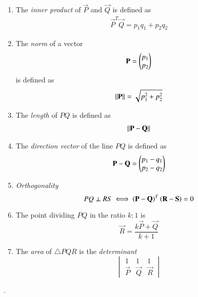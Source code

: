 \renewcommand{\theequation}{\theenumi}

\begin{enumerate}[label=\arabic*.,ref=\thesubsection.\theenumi]

\item The {\em inner product} of  $\vec{P}$ and $\vec{Q}$ is defined as
\begin{align}
\vec{P}^T\vec{Q} = p_1q_1+p_2q_2
\end{align}
\item The {\em norm} of a vector 
\begin{align}
\mathbf{P} = \begin{pmatrix}p_1\\p_2\end{pmatrix}
\end{align}
is defined as
\begin{align}
\lVert\mathbf{P}\rVert = \sqrt{p_1^2+p_2^2}
\end{align}
\item The {\em length} of $PQ$ is defined as
\begin{align}
\lVert\mathbf{P}-\mathbf{Q}\rVert
\end{align}


%
\item The {\em direction vector} of the line $PQ$ is defined as 
\begin{align}
\mathbf{P}-\mathbf{Q} = \begin{pmatrix}p_1-q_1\\p_2-q_2\end{pmatrix}
\end{align}
%
\item {\em Orthogonality}
\begin{equation}
PQ \perp RS
\iff \left(\mathbf{P}-\mathbf{Q}\right)^T\left(\mathbf{R}-\mathbf{S}\right) = 0
\end{equation}
\item The point dividing   $PQ$  in the ratio $k:1$ is
\begin{equation}
\vec{R} = \frac{k\vec{P}+\vec{Q}}{k+1}
\end{equation}
%
\item The {\em area} of $\triangle PQR$ is the {\em determinant}
\begin{equation}
\begin{vmatrix}
1 & 1 & 1
\\
\vec{P} & \vec{Q} &\vec{R}
\end{vmatrix}
\end{equation}


\end{enumerate}
.
